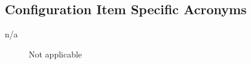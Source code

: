 \subsection{Configuration Item Specific Acronyms}
\begin{description}
\item[n/a] \quad Not applicable
\end{description}

